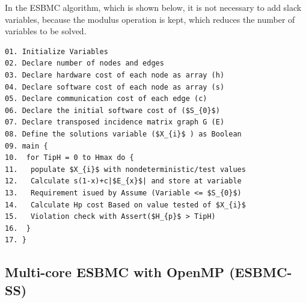 In the ESBMC algorithm, which is shown below, it is not necessary to add slack variables, because the modulus operation is kept, which reduces the number of variables to be solved. 

\begin{lstlisting}[caption=Pseudocode describing ESBMC, mathescape]
01. Initialize Variables 
02. Declare number of nodes and edges
03. Declare hardware cost of each node as array (h)
04. Declare software cost of each node as array (s)
05. Declare communication cost of each edge (c)
06. Declare the initial software cost of ($S_{0}$)
07. Declare transposed incidence matrix graph G (E)
08. Define the solutions variable ($X_{i}$ ) as Boolean
09. main {
10.  for TipH = 0 to Hmax do {
11.   populate $X_{i}$ with nondeterministic/test values
12.   Calculate s(1-x)+c|$E_{x}$| and store at variable
13.   Requirement isued by Assume (Variable <= $S_{0}$)
14.   Calculate Hp cost Based on value tested of $X_{i}$
15.   Violation check with Assert($H_{p}$ > TipH)
16.  }
17. }
\end{lstlisting}




\subsection{Multi-core ESBMC with OpenMP (ESBMC-SS)}
\label{Multi-core-ESBMC-with-OpenMP}

